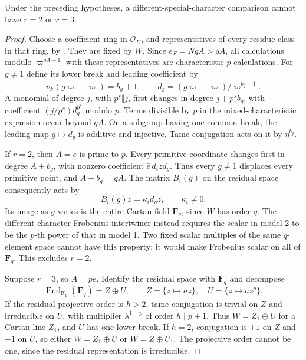\begin{lemma}
\label{lem:B-RD67-small-wild}
Under the preceding hypotheses, a different-special-character
comparison cannot have \(r=2\) or \(r=3\).
\end{lemma}
\begin{proof}
Choose a coefficient ring in \(\mathcal O_K\), and representatives
of every residue class in that ring, by
\cite[Theorem 10.160.8 and proof]{Stacks032A}.
They are fixed by \(W\). Since \(e_F=NqA>qA\), all calculations
modulo \(\varpi^{qA+1}\) with these representatives are
characteristic-\(p\) calculations. For \(g\ne1\) define its lower
break and leading coefficient by
\[
 v_F(g\varpi-\varpi)=b_g+1,\qquad
 d_g=\overline{(g\varpi-\varpi)/\varpi^{b_g+1}} .
 \tag{B-RD67.4}
\]
A monomial of degree \(j\), with \(p^s\Vert j\), first changes
in degree \(j+p^s b_g\), with coefficient
\((j/p^s)d_g^{p^s}\) modulo \(p\). Terms divisible by \(p\)
in the mixed-characteristic expansion occur beyond \(qA\).
On a subgroup having one common break, the leading map
\(g\mapsto d_g\) is additive and injective. Tame conjugation
acts on it by \(\eta^{b_g}\).

If \(r=2\), then \(A=e\) is prime to \(p\). Every primitive
coordinate changes first in degree \(A+b_g\), with nonzero
coefficient \(\bar e\,d_i z d_g\). Thus every \(g\ne1\)
displaces every primitive point, and \(A+b_g=qA\). The matrix
\(B_i(g)\) on the residual space consequently acts by
\[
 B_i(g)z=\kappa_i d_g z,\qquad \kappa_i\ne0.
 \tag{B-RD67.5}
\]
Its image as \(g\) varies is the entire Cartan field
\(\mathbf F_q\), since \(W\) has order \(q\).
The different-character Frobenius intertwiner instead requires
the scalar in model 2 to be the \(p\)-th power of that in
model 1. Two fixed scalar multiples of the same \(q\)-element
space cannot have this property: it would make Frobenius scalar
on all of \(\mathbf F_q\). This excludes \(r=2\).

Suppose \(r=3\), so \(A=pe\). Identify the residual space with
\(\mathbf F_q\) and decompose
\[
 \operatorname{End}_{\mathbf F_p}(\mathbf F_q)=Z\oplus U,\qquad
 Z=\{z\mapsto az\},\quad U=\{z\mapsto az^p\}.
\]
If the residual projective order is \(h>2\), tame conjugation
is trivial on \(Z\) and irreducible on \(U\), with multiplier
\(\lambda^{1-p}\) of order \(h\mid p+1\). Thus
\(W=Z_1\oplus U\) for a Cartan line \(Z_1\), and \(U\) has
one lower break. If \(h=2\), conjugation is \(+1\) on \(Z\)
and \(-1\) on \(U\), so either \(W=Z_1\oplus U\) or
\(W=Z\oplus U_1\). The projective order cannot be one,
since the residual representation is irreducible.


\end{proof}
